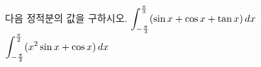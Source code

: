 다음 정적분의 값을 구하시오.
 $\displaystyle\int_{-\frac{\pi}{3}}^{\frac{\pi}{3}}(\sin x+\cos x+\tan x)\mkern3mu dx$
 $\displaystyle\int_{-\frac{\pi}{2}}^{\frac{\pi}{2}}(x^2\sin x+\cos x)\mkern3mu dx$
